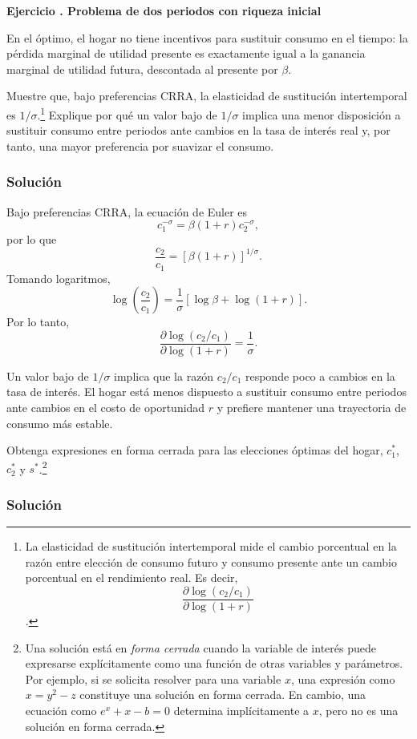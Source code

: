 \documentclass[11pt]{article}
\let\enumerateoriginal\enumerate
\let\endenumerateoriginal\endenumerate
\renewenvironment{enumerate}{%
  \enumerateoriginal
  \setlength{\itemsep}{0.5em}%
  \setlength{\parsep}{0pt}%
  \setlength{\topsep}{0.4em}%
}{\endenumerateoriginal}
\newcounter{problema}
\newenvironment{problema}[1]{%
  \par
  \refstepcounter{problema}%
  \addvspace{0.9em}%
  \noindent\textbf{Ejercicio \theproblema. #1}
  \par\nobreak\smallskip
}{\par}
\begin{document}
\begin{problema}{Problema de dos periodos con riqueza inicial}
\begin{enumerate}
En el óptimo, el hogar no tiene incentivos para sustituir consumo en el tiempo: la pérdida marginal de utilidad presente es exactamente igual a la ganancia marginal de utilidad futura, descontada al presente por $\beta$.


    \item Muestre que, bajo preferencias CRRA, la elasticidad de sustitución intertemporal es $1/\sigma$.\footnote{La elasticidad de sustitución intertemporal mide el cambio porcentual en la razón entre elección de consumo futuro y consumo presente ante un cambio porcentual en el rendimiento real. Es decir,
      \[
        \frac{\partial\log(c_2/c_1)}{\partial\log(1+r)}
      \].} Explique por qué un valor bajo de $1/\sigma$ implica una menor disposición a sustituir consumo entre periodos ante cambios en la tasa de interés real y, por tanto, una mayor preferencia por suavizar el consumo.


\subsubsection*{Solución}
Bajo preferencias CRRA, la ecuación de Euler es
\[
  c_1^{-\sigma}
  =
  \beta(1+r)c_2^{-\sigma},
\]
por lo que
\[
  \frac{c_2}{c_1}
  =
  \left[\beta(1+r)\right]^{1/\sigma}.
\]
Tomando logaritmos,
\[
  \log\left(\frac{c_2}{c_1}\right)
  =
  \frac{1}{\sigma}
  \left[\log\beta+\log(1+r)\right].
\]
Por lo tanto,
\[
  \boxed{
  \frac{\partial\log(c_2/c_1)}
  {\partial\log(1+r)}
  =
  \frac{1}{\sigma}
  }.
\]

Un valor bajo de \(1/\sigma\) implica que la razón \(c_2/c_1\) responde poco a cambios en la tasa de interés. El hogar está menos dispuesto a sustituir consumo entre periodos ante cambios en el costo de oportunidad $r$ y prefiere mantener una trayectoria de consumo más estable.




    \item Obtenga expresiones en forma cerrada para las elecciones óptimas del hogar, $c_1^*$, $c_2^*$ y $s^*$.\footnote{Una solución está en \textit{forma cerrada} cuando la variable de interés puede expresarse explícitamente como una función de otras variables y parámetros. Por ejemplo, si se solicita resolver para una variable $x$, una expresión como $x=y^2-z$ constituye una solución en forma cerrada. En cambio, una ecuación como $e^x+x-b=0$ determina implícitamente a $x$, pero no es una solución en forma cerrada.}
    

\subsubsection*{Solución}


\end{enumerate}
\end{problema}
\end{document}
